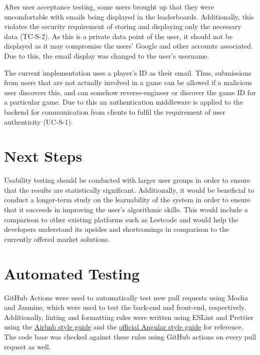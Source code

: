 \documentclass[12pt, titlepage]{article}
\begin{document}
After user acceptance testing, some users brought up that they were uncomfortable with emails being displayed in the leaderboards. Additionally, this violates the security requirement of storing and displaying only the necessary data (TC-S-2). As this is a private data point of the user, it should not be displayed as it may compromise the users' Google and other accounts associated. Due to this, the email display was changed to the user's username. 

The current implementation uses a player's ID as their email. Thus, submissions from users that are not actually involved in a game can be allowed if a malicious user discovers this, and can somehow reverse-engineer or discover the game ID for a particular game. Due to this an authentication middleware is applied to the backend for communication from clients to fulfil the requirement of user authenticity (UC-S-1).

\section{Next Steps}
Usability testing should be conducted with larger user groups in order to ensure that the results are statistically significant. Additionally, it would be beneficial to conduct a longer-term study on the learnability of the system in order to ensure that it succeeds in improving the user's algorithmic skills. This would include a comparison to other existing platforms such as Leetcode and would help the developers understand its upsides and shortcomings in comparison to the currently offered market solutions.

\section{Automated Testing}\label{sec:auto}

GitHub Actions were used to automatically test new pull requests using Mocha and Jasmine, which were used to test the back-end and front-end, respectively. Additionally, linting and formatting rules were written using ESLint and Prettier using the \href{https://github.com/airbnb/javascript}{Airbnb style guide} and the \href{https://angular.io/guide/styleguide}{official Angular style guide} for reference. The code base was checked against these rules using GitHub actions on every pull request as well.
\end{document}
